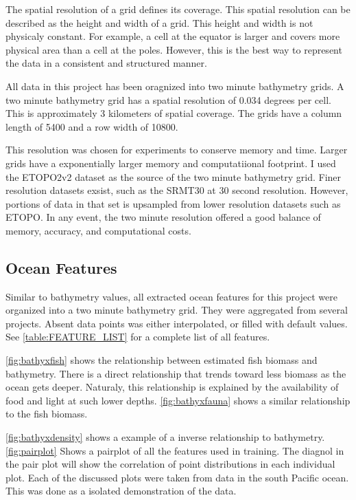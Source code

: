 \par
The spatial resolution of a grid defines its coverage.
This spatial resolution can be described as the height and width of a grid.
This height and width is not physicaly constant.
For example, a cell at the equator is larger and covers more physical area than a cell at the poles.
However, this is the best way to represent the data in a consistent and structured manner.

\par
All data in this project has been oragnized into two minute bathymetry grids.
A two minute bathymetry grid has a spatial resolution of 0.034 degrees per cell.
This is approximately 3 kilometers of spatial coverage.
The grids have a column length of 5400 and a row width of 10800.

\par
This resolution was chosen for experiments to conserve memory and time.
Larger grids have a exponentially larger memory and computatiional footprint.
I used the \ac{ETOPO}2v2 \cite{national1988etopo} dataset as the source of the two minute bathymetry grid.
Finer resolution datasets exsist, such as the SRMT30 \cite{becker2009global} at 30 second resolution.
However, portions of data in that set is upsampled from lower resolution datasets such as ETOPO.
In any event, the two minute resolution offered a good balance of memory, accuracy, and computational costs.

\subsection{Ocean Features}
Similar to bathymetry values, all extracted ocean features for this project were organized into a two minute bathymetry grid.
They were aggregated from several projects.
Absent data points was either interpolated, or filled with default values.
See \ref{table:FEATURE_LIST} for a complete list of all features.

\par
\ref{fig:bathyxfish} shows the relationship between estimated fish biomass and bathymetry.
There is a direct relationship that trends toward less biomass as the ocean gets deeper.
Naturaly, this relationship is explained by the availability of food and light at such lower depths.
\ref{fig:bathyxfauna} shows a similar relationship to the fish biomass.

\par
\ref{fig:bathyxdensity} shows a example of a inverse relationship to bathymetry.
\ref{fig:pairplot} Shows a pairplot of all the features used in training.
The diagnol in the pair plot will show the correlation of point distributions in each individual plot.
Each of the discussed plots were taken from data in the south Pacific ocean.
This was done as a isolated demonstration of the data.


